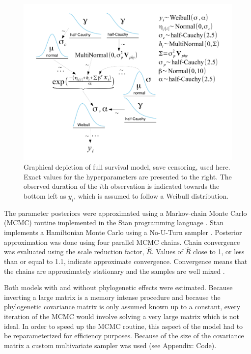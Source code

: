 \documentclass[12pt,letterpaper]{article}
\begin{document}
\begin{figure}
  \centering
  \includegraphics[height = 0.5\textheight, width = \textwidth, keepaspectratio = true]{figure/mammal_survival_model}
  \caption{Graphical depiction of full survival model, save censoring, used here. Exact values for the hyperparameters are presented to the right. The observed duration of the \(i\)th observation is indicated towards the bottom left as \(y_{i}\), which is assumed to follow a Weibull distribution.}
  \label{fig:model_diagram}
\end{figure}


The parameter posteriors were approximated using a Markov-chain Monte Carlo (MCMC) routine implemented in the Stan programming language \citep{2014stan}. Stan implements a Hamiltonian Monte Carlo using a No-U-Turn sampler \citep{Hoffman-Gelman:2011}. Posterior approximation was done using four parallel MCMC chains. Chain convergence was evaluated using the scale reduction factor, \(\hat{R}\). Values of \(\hat{R}\) close to 1, or less than or equal to 1.1, indicate approximate convergence. Convergence means that the chains are approximately stationary and the samples are well mixed \citep{Gelman2013d}.

Both models with and without phylogenetic effects were estimated. Because inverting a large matrix is a memory intense procedure and because the phylogenetic covariance matrix is only assumed known up to a constant, every iteration of the MCMC would involve solving a very large matrix which is not ideal. In order to speed up the MCMC routine, this aspect of the model had to be reparameterized for efficiency purposes. Because of the size of the covariance matrix a custom multivariate sampler was used (see Appendix: Code).
\end{document}
